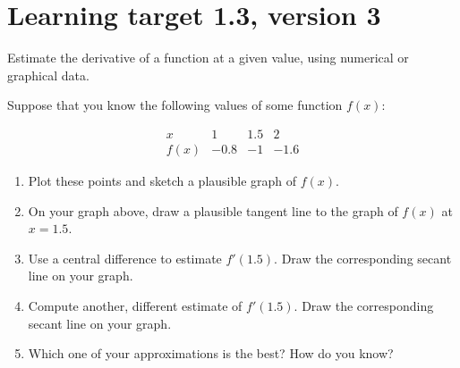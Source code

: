 \pagebreak

\section{Learning target 1.3, version 3}

Estimate the derivative of a function at a given value, using numerical or graphical data.

\hrulefill


\everymath{\displaystyle}

Suppose that you know the following values of some function $f(x)$:

\[
\begin{array}{c||r|r|r}
      x  &  1 &  1.5   &  2 \\\hline
    f(x) & -0.8 & -1   & -1.6
\end{array}
\]
\begin{enumerate}[leftmargin=0pt]

\item Plot these points and sketch a plausible graph of $f(x)$.


\item On your graph above, draw a plausible tangent line to the graph of $f(x)$ at $x=1.5$.

\item Use a central difference to estimate $f'(1.5)$. Draw the corresponding secant line on your graph.
\vfill

\item Compute another, different estimate of $f'(1.5)$. Draw the corresponding secant line on your graph.

\vfill

\item Which one of your approximations is the best? How do you know?

\vspace{1cm}

\end{enumerate}

